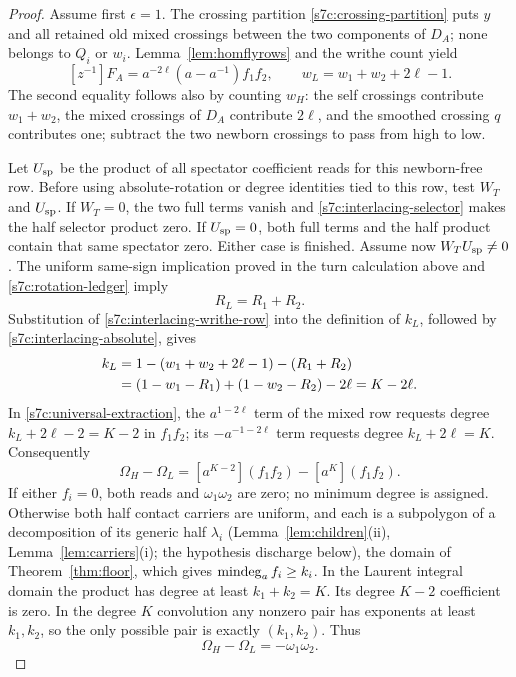 \begin{proof}
Assume first $\epsilon=1$.  The crossing partition
\eqref{s7c:crossing-partition} puts $y$ and all retained old mixed
crossings between the two components of $D_A$; none belongs to $Q_i$
or $w_i$.  Lemma~\ref{lem:homflyrows} and the writhe count yield
\begin{equation}\label{s7c:interlacing-writhe-row}
 [z^{-1}]F_A=a^{-2\ell}(a-a^{-1})f_1f_2,
 \qquad w_L=w_1+w_2+2\ell-1.
\end{equation}
The second equality follows also by counting $w_H$: the self crossings
contribute $w_1+w_2$, the mixed crossings of $D_A$ contribute $2\ell$,
and the smoothed crossing $q$ contributes one; subtract the two newborn
crossings to pass from high to low.

Let $U_{\rm sp}$ be the product of all spectator coefficient reads for
this newborn-free row.  Before using absolute-rotation or degree identities
tied to this row, test $W_T$ and $U_{\rm sp}$.  If $W_T=0$, the two
full terms vanish and \eqref{s7c:interlacing-selector} makes the half
selector product zero.  If $U_{\rm sp}=0$, both full terms and the
half product contain that same spectator zero.  Either case is finished.
Assume now $W_TU_{\rm sp}\ne0$.  The uniform same-sign implication
proved in the turn calculation above and
\eqref{s7c:rotation-ledger} imply
\begin{equation}\label{s7c:interlacing-absolute}
 R_L=R_1+R_2.
\end{equation}
Substitution of \eqref{s7c:interlacing-writhe-row} into the definition
of $k_L$, followed by \eqref{s7c:interlacing-absolute}, gives
\begin{align}
 k_L&=1-(w_1+w_2+2\ell-1)-(R_1+R_2)\notag\\
    &=(1-w_1-R_1)+(1-w_2-R_2)-2\ell
      =K-2\ell.\label{s7c:interlacing-slot}
\end{align}
In \eqref{s7c:universal-extraction}, the $a^{1-2\ell}$ term of
the mixed row requests degree $k_L+2\ell-2=K-2$ in $f_1f_2$;
its $-a^{-1-2\ell}$ term requests degree $k_L+2\ell=K$.
Consequently
\begin{equation}\label{s7c:interlacing-extraction}
 \Omega_H-\Omega_L=[a^{K-2}](f_1f_2)-[a^K](f_1f_2).
\end{equation}
If either $f_i=0$, both reads and $\omega_1\omega_2$ are zero;
no minimum degree is assigned.  Otherwise both half contact carriers
are uniform, and each is a subpolygon of a decomposition of its generic
half $\lambda_i$ (Lemma~\ref{lem:children}(ii), Lemma~\ref{lem:carriers}(i);
the hypothesis discharge below), the domain of Theorem~\ref{thm:floor},
which gives $\operatorname{mindeg}_a f_i\ge k_i$.
In the Laurent integral domain the product has degree at least
$k_1+k_2=K$.  Its degree $K-2$ coefficient is zero.  In the degree
$K$ convolution any nonzero pair has exponents at least $k_1,k_2$,
so the only possible pair is exactly $(k_1,k_2)$.  Thus
\begin{equation}\label{s7c:interlacing-coefficient-result}
 \Omega_H-\Omega_L=-\omega_1\omega_2.
\end{equation}


\end{proof}
